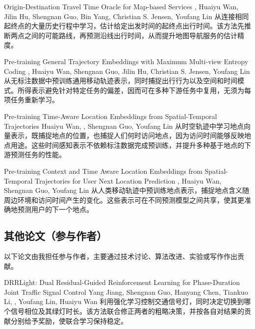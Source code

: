 {Origin-Destination Travel Time Oracle for Map-based Services}
{\me, Huaiyu Wan, Jilin Hu, Shengnan Guo, Bin Yang, Christian S. Jensen, Youfang Lin}
{从连接相同起终点的大量历史行程中学习，估计给定出发时间的起终点出行时间。该方法先推断两点之间的可能路线，再预测沿线出行时间，从而提升地图导航服务的估计精度。}

{Pre-training General Trajectory Embeddings with Maximum Multi-view Entropy Coding}
{\me, Huaiyu Wan, Shengnan Guo, Jilin Hu, Christian S. Jensen, Youfang Lin}
{从无标注数据中预训练通用移动轨迹表示，同时捕捉出行行为以及空间和时间模式。所得表示避免针对特定任务的偏差，因而可在多种下游任务中复用，无须为每项任务重新学习。}

{Pre-training Time-Aware Location Embeddings from Spatial-Temporal Trajectories}
{Huaiyu Wan, \me, Shengnan Guo, Youfang Lin}
{从时空轨迹中学习地点向量表示，既捕捉地点的位置，也捕捉人们何时访问地点，因为访问时间能够反映地点用途。这些时间感知表示不依赖标注数据完成预训练，并提升多种基于地点的下游预测任务的性能。}

{Pre-training Context and Time Aware Location Embeddings from Spatial-Temporal Trajectories for User Next Location Prediction}
{\me, Huaiyu Wan, Shengnan Guo, Youfang Lin}
{从人类移动轨迹中预训练地点表示，捕捉地点含义随周边环境和访问时间产生的变化。这些表示可在不同预测模型之间共享，使其更准确地预测用户的下一个地点。}

\subsection*{其他论文（参与作者）}
以下论文由我担任参与作者，主要通过技术讨论、算法改进、实验或写作作出贡献。

{DRRLight: Dual Residual-Guided Reinforcement Learning for Phase-Duration Joint Traffic Signal Control}
{Yang Jiang, Shengnan Guo, Hanyang Chen, Tiankuo Li, \me, Youfang Lin, Huaiyu Wan}
{利用强化学习控制交通信号灯，同时决定切换到哪个信号相位及其绿灯时长。该方法联合修正两者的粗略决策，并按各自对结果的贡献分别给予奖励，使联合学习保持稳定。}

